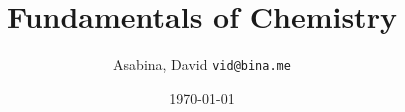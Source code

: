 \documentclass[9pt,a4paper]{IEEEtran}
\author{
  Asabina, David \texttt{vid@bina.me}
}
\date{\today}
\title{Fundamentals of Chemistry}
\begin{document}
  \maketitle

  \begin{abstract}
    
  \end{abstract}

  \begin{IEEEkeywords}
    
  \end{IEEEkeywords}

  { %
  \hypersetup{linkcolor=black}
  \setcounter{tocdepth}{3}
  \tableofcontents
  }

  

  
  

  \printindex
\end{document}

